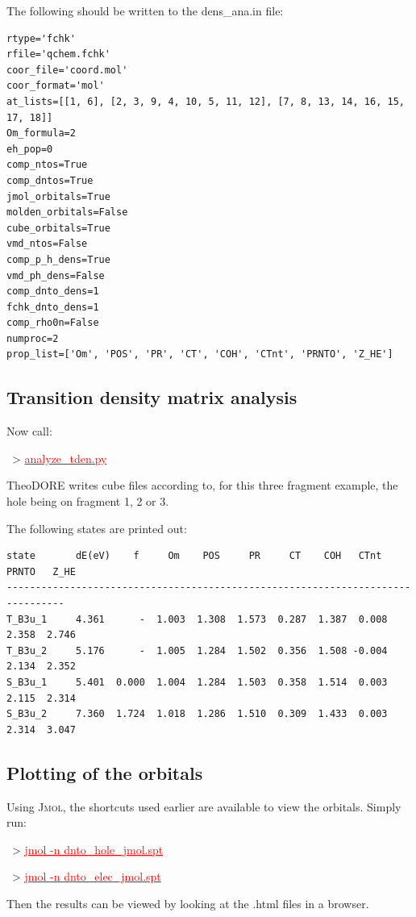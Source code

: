\documentclass[DIV=12,headings=normal]{scrartcl}
\newcommand{\redl}[1]{{\textcolor{red}{\underline{#1}}}}
\newcommand{\comm}[1]{
\small
~> \redl{#1}
\normalsize
}
\begin{document}
The following should be written to the dens{\_}ana.in file:
\scriptsize
\begin{Verbatim}[commandchars=\\\{\}]
rtype='fchk'
rfile='qchem.fchk'
coor_file='coord.mol'
coor_format='mol'
at_lists=[[1, 6], [2, 3, 9, 4, 10, 5, 11, 12], [7, 8, 13, 14, 16, 15, 17, 18]]
Om_formula=2
eh_pop=0
comp_ntos=True
comp_dntos=True
jmol_orbitals=True
molden_orbitals=False
cube_orbitals=True
vmd_ntos=False
comp_p_h_dens=True
vmd_ph_dens=False
comp_dnto_dens=1
fchk_dnto_dens=1
comp_rho0n=False
numproc=2
prop_list=['Om', 'POS', 'PR', 'CT', 'COH', 'CTnt', 'PRNTO', 'Z_HE']
\end{Verbatim}
\normalsize

\subsection{Transition density matrix analysis}
Now call:
\comm{analyze\_tden.py}

TheoDORE writes cube files according to, for this three fragment example, the hole being on fragment 1, 2 or 3.

The following states are printed out:

\scriptsize
\begin{Verbatim}[commandchars=\\\{\}]
state       dE(eV)    f     Om    POS     PR     CT    COH   CTnt  PRNTO   Z_HE
--------------------------------------------------------------------------------
T_B3u_1     4.361      -  1.003  1.308  1.573  0.287  1.387  0.008  2.358  2.746
T_B3u_2     5.176      -  1.005  1.284  1.502  0.356  1.508 -0.004  2.134  2.352
S_B3u_1     5.401  0.000  1.004  1.284  1.503  0.358  1.514  0.003  2.115  2.314
S_B3u_2     7.360  1.724  1.018  1.286  1.510  0.309  1.433  0.003  2.314  3.047
\end{Verbatim}
\normalsize

\subsection{Plotting of the orbitals}
Using \textsc{Jmol}, the shortcuts used earlier are available to view the orbitals. Simply run:

\comm{jmol -n dnto\_hole\_jmol.spt}
\comm{jmol -n dnto\_elec\_jmol.spt}

Then the results can be viewed by looking at the .html files in a browser.
\end{document}
